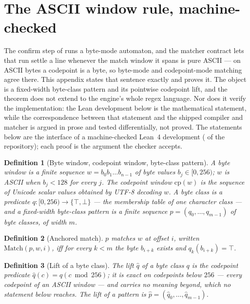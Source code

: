 \documentclass[11pt,letterpaper]{article}
\newtheorem{definition}{Definition}
\begin{document}
\section{The ASCII window rule, machine-checked}
\label{app:window}
The confirm step of  runs a byte-mode automaton,
and the matcher contract lets that run settle a line whenever the match
window it spans is pure ASCII --- on ASCII bytes a codepoint is a byte, so
byte-mode and codepoint-mode matching agree there. This appendix states
that sentence exactly and proves it. The object is a fixed-width byte-class
pattern and its pointwise codepoint lift, and the theorem does not extend to
the engine's whole regex language. Nor does it verify the implementation: the
Lean development below is the mathematical statement, while the correspondence
between that statement and the shipped compiler and matcher is argued in prose
and tested differentially, not proved. The statements below are the
interface of a machine-checked Lean~4 development ( of the
repository); each proof is the argument the checker accepts.

\begin{definition}[Byte window, codepoint window, byte-class pattern]
\label{def:window}
A \emph{byte window} is a finite sequence $w=b_0b_1\dots b_{n-1}$ of byte
values $b_j\in[0,256)$; $w$ is \emph{ASCII} when $b_j<128$ for every $j$.
The \emph{codepoint window} $\mathrm{cp}(w)$ is the sequence of Unicode
scalar values obtained by UTF-8 decoding $w$. A \emph{byte class} is a
predicate $q:[0,256)\to\{\top,\bot\}$ --- the membership table of one
character class --- and a \emph{fixed-width byte-class pattern} is a
finite sequence $p=(q_0,\dots,q_{m-1})$ of byte classes, of width $m$.
\end{definition}

\begin{definition}[Anchored match]
\label{def:anchored}
$p$ matches $w$ \emph{at offset} $i$, written $\mathrm{Match}(p,w,i)$, iff
for every $k<m$ the byte $b_{i+k}$ exists and $q_k(b_{i+k})=\top$.
\end{definition}

\begin{definition}[Lift of a byte class]
\label{def:lift}
The \emph{lift} $\hat q$ of a byte class $q$ is the codepoint predicate
$\hat q(c)=q(c \bmod 256)$; it is exact on codepoints below $256$ ---
every codepoint of an ASCII window --- and carries no meaning beyond,
which no statement below reaches. The lift of a pattern is
$\hat p=(\hat q_0,\dots,\hat q_{m-1})$.
\end{definition}
\end{document}
